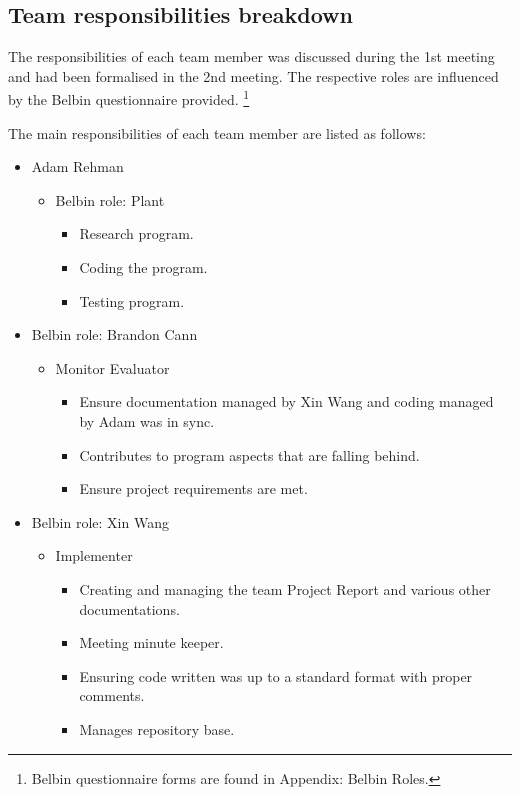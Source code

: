 \documentclass[12pt,a4paper]{article}
\begin{document}
	\subsection{Team responsibilities breakdown}
	The responsibilities of each team member was discussed during the 1st meeting and had been formalised in the 2nd meeting. The
	respective roles are influenced by the Belbin questionnaire provided.
	\footnote{Belbin questionnaire forms are found in Appendix: Belbin Roles.}
	\par
	The main responsibilities of each team member are listed as follows:
	\begin{itemize}
		\item Adam Rehman
		\begin{itemize}
			\item Belbin role: Plant
			\begin{itemize}
				\item Research program.
				\item Coding the program.
				\item Testing program.
			\end{itemize}
		\end{itemize}
		\item Belbin role: Brandon Cann
		\begin{itemize}
			\item Monitor Evaluator
			\begin{itemize}
				\item Ensure documentation managed by Xin Wang and coding managed by Adam was in sync.
				\item Contributes to program aspects that are falling behind.
				\item Ensure project requirements are met.
			\end{itemize}
		\end{itemize}
		\item Belbin role: Xin Wang
		\begin{itemize}
			\item Implementer
			\begin{itemize}
				\item Creating and managing the team Project Report and various other documentations.
				\item Meeting minute keeper.
				\item Ensuring code written was up to a standard format with proper comments.
				\item Manages repository base.
			\end{itemize}
		\end{itemize}
	\end{itemize}
\end{document}
